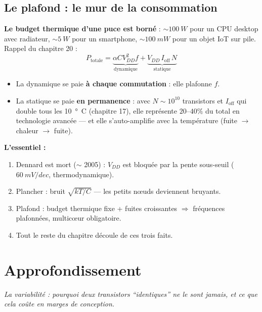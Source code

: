 \documentclass[12pt,a4paper,twoside]{book}
\begin{document}
\subsection{Le plafond : le mur de la consommation}

\begin{formule}
\textbf{Le budget thermique d'une puce est borné} : $\sim\SI{100}{W}$ pour un CPU desktop avec radiateur, $\sim\SI{5}{W}$ pour un smartphone, $\sim\SI{100}{mW}$ pour un objet IoT sur pile. Rappel du chapitre 20 :
\[
P_{\text{totale}} = \underbrace{\alpha C V_{DD}^2 f}_{\text{dynamique}} + \underbrace{V_{DD}\, I_{\text{off}}\, N}_{\text{statique}}
\]
\begin{itemize}[nosep]
\item La dynamique se paie \textbf{à chaque commutation} : elle plafonne $f$.
\item La statique se paie \textbf{en permanence} : avec $N \sim 10^{10}$ transistors et $I_{\text{off}}$ qui double tous les \SI{10}{°C} (chapitre 17), elle représente $20$--$40\%$ du total en technologie avancée --- et elle s'auto-amplifie avec la température (fuite $\to$ chaleur $\to$ fuite).
\end{itemize}
\end{formule}

\begin{retenir}
\textbf{L'essentiel :}
\begin{enumerate}[nosep]
\item Dennard est mort ($\sim$ 2005) : $V_{DD}$ est bloquée par la pente sous-seuil ($\SI{60}{mV/dec}$, thermodynamique).
\item Plancher : bruit $\sqrt{kT/C}$ --- les petits nœuds deviennent bruyants.
\item Plafond : budget thermique fixe + fuites croissantes $\Rightarrow$ fréquences plafonnées, multicœur obligatoire.
\item Tout le reste du chapitre découle de ces trois faits.
\end{enumerate}
\end{retenir}

\section{Approfondissement}

\vspace{0.3cm}
\textit{La variabilité : pourquoi deux transistors ``identiques'' ne le sont jamais, et ce que cela coûte en marges de conception.}
\vspace{0.3cm}
\end{document}
